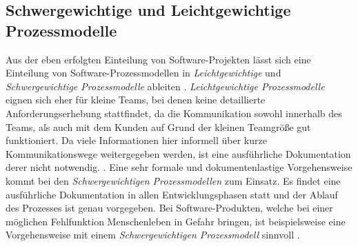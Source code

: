 \subsection{Schwergewichtige und Leichtgewichtige Prozessmodelle}

Aus der eben erfolgten Einteilung von Software-Projekten lässt sich eine Einteilung von Software-Prozessmodellen in \textit{Leichtgewichtige} und \textit{Schwergewichtige Prozessmodelle} ableiten \cite{Hanser2010}. \newline
\textit{Leichtgewichtige Prozessmodelle} eignen sich eher für kleine Teams, bei denen keine detaillierte Anforderungserhebung stattfindet, da die Kommunikation sowohl innerhalb des Teams, als auch mit dem Kunden auf Grund der kleinen Teamgröße gut funktioniert. Da viele Informationen hier informell über kurze Kommunikationswege weitergegeben werden, ist eine ausführliche Dokumentation derer nicht notwendig. \cite{Hanser2010}. \newline
Eine sehr formale und dokumentenlastige Vorgehensweise kommt bei den \textit{Schwergewichtigen Prozessmodellen} zum Einsatz. Es findet eine ausführliche Dokumentation in allen Entwicklungsphasen statt und der Ablauf des Prozesses ist genau vorgegeben. Bei Software-Produkten, welche bei einer möglichen Fehlfunktion Menschenleben in Gefahr bringen, ist beispielsweise eine Vorgehensweise mit einem \textit{Schwergewichtigen Prozessmodell} sinnvoll \cite{Hanser2010}. \newline














